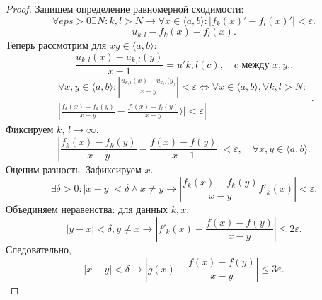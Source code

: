 \documentclass[11pt]{book}
\renewcommand{\le}{\leqslant}
\theoremstyle{definition}
\theoremstyle{plain}
\theoremstyle{plain}
\theoremstyle{definition}
\theoremstyle{remark}
\begin{document}
\begin{proof}
    Запишем определение равномерной сходимости:
    \[
	\forall  eps >0 \exists  N : k, l > N \to  \forall  x \in  \langle a, b\rangle : |f_k(x) ' - f_l(x) '| < \varepsilon
    .\]
    \[
	u_{k, l} - f_k(x) - f_l(x)
    .\]
    Теперь рассмотрим для $x y \in  \langle a, b \rangle:$
    \[
	\frac{u_{k, l} (x)  - u_{k, l} (y)}{x-1} = u'{k,l}(c), \quad c \text{ между } x, y.
    .\]
    \[
	\begin{array}{r}
	    \forall x, y \in  \langle a, b \rangle : \left | \frac{u_{k, l} (x) - u_{k, l} (y_)}{x - y} \right | < \varepsilon  \Longleftrightarrow \forall  x \in  \langle a, b \rangle , \forall  k, l > N:\\
	    \left | \frac{f_k(x) - f_k(y) }{x-y} - \frac{f_l(x) - f_l(y)}{x-y} \rangle | < \varepsilon
	    \right |
	\end{array}
    .\]
    Фиксируем $k$, $l \to  \infty$.
    \[
	\left | \frac{f_k(x) - f_k(y)}{x - y} - \frac{f(x) - f(y)}{x-1} \right | < \varepsilon  , \quad \forall  x, y \in  \langle a, b \rangle
    .\]
    Оценим разность. Зафиксируем $ x$.
    \[
	\exists  \delta  >0 : |x-y| < \delta  \wedge x \ne y\to  \left|\frac{f_k(x) - f_k(y)}{x-y} f'_k(x)\right|  < \varepsilon
    .\]
    Объединяем неравенства:
    для данных $ k, x$:
    \[
	|y - x| < \delta  , y \ne x \to  \left|f'_k(x) - \frac{f(x) - f(y)}{x-y}\right| \le  2 \varepsilon
    .\]
    Следовательно,
    \[
	|x - y| < \delta \to  \left|g(x) - \frac{f(x) - f(y)}{x-y}\right| \le 3 \varepsilon
    .\]
\end{proof}
\end{document}

